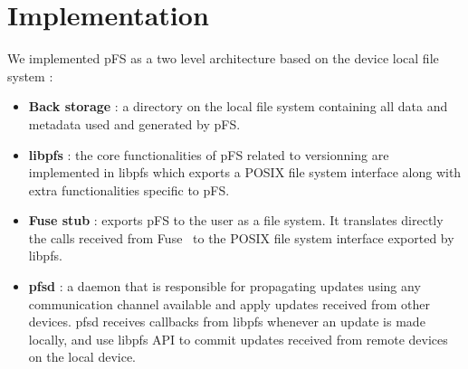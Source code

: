 
\section{Implementation}
\label{sec:impl}

%


We implemented pFS as a two level architecture based on the device
local file system :

\begin {itemize}
\item \textbf{Back storage} : a directory on the local file system
  containing all data and metadata used and generated by pFS.
\item \textbf{libpfs} : the core functionalities of pFS related to
  versionning are implemented in libpfs which exports a POSIX file
  system interface along with extra functionalities specific to
  pFS.
\item \textbf{Fuse stub} : exports pFS to the user as a file
  system. It translates directly the calls received from
  Fuse~\cite{henk:fuse} to the POSIX file system interface exported by
  libpfs.
\item \textbf{pfsd} : a daemon that is responsible for propagating
  updates using any communication channel available and apply updates
  received from other devices. pfsd receives callbacks from libpfs
  whenever an update is made locally, and use libpfs API to commit
  updates received from remote devices on the local device.
\end {itemize}


